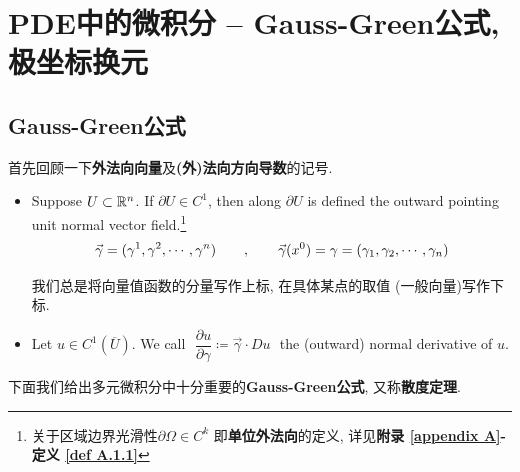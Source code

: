 \newpage

\section{PDE中的微积分 -- Gauss-Green公式, 极坐标换元}
\subsection{Gauss-Green公式}
	首先回顾一下\textbf{外法向向量}及\textbf{(外)法向方向导数}的记号.
	\begin{itemize}
		\item Suppose $U \subset \mathbb{R}^n$. If $\partial U \in C^1$, then along $\partial U$ is defined the outward pointing unit normal vector field.\footnote{关于区域边界光滑性$\partial \Omega \in C^k$ 即\textbf{单位外法向}的定义, 详见\textbf{附录 \ref{appendix A}-定义 \ref{def A.1.1}}}
		\[ \vec{\gamma} = (\gamma^1 , \gamma^2 , \cdots , \gamma^n) 
		\hspace*{2em} , \hspace*{2em} 
		\vec{\gamma}(x^0) = \gamma = (\gamma_1 , \gamma_2 , \cdots , \gamma_n) \]
		
		\begin{rmk}
			我们总是将向量值函数的分量写作上标, 在具体某点的取值 (一般向量)写作下标.
		\end{rmk}
		
		\vspace{2em}
		
		\item Let $u \in C^{1}(\overline{U})$. We call $\,\, \dfrac{\partial u}{\partial \gamma} \coloneqq \vec{\gamma} \cdot Du \,\,$ the (outward) normal derivative of $u$.
	\end{itemize}
	
	\vspace{6em}
	
	下面我们给出多元微积分中十分重要的\textbf{Gauss-Green公式}, 又称\textbf{散度定理}.
	
